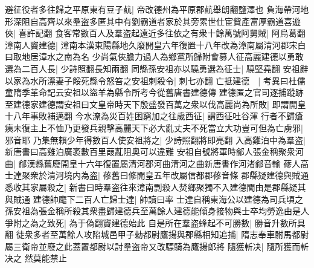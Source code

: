避征役者多往歸之平原東有豆子䴚|{
	帝改德州為平原郡䴚舉朗翻鹽澤也}
負海帶河地形深阻自高齊以來羣盗多匿其中有劉霸道者家於其旁累世仕宦貲產富厚霸道喜遊俠|{
	喜許記翻}
食客常數百人及羣盗起遠近多往依之有衆十餘萬號阿舅賊|{
	阿烏葛翻}
漳南人竇建德|{
	漳南本漢東陽縣地久廢開皇六年復置十八年改為漳南屬清河郡宋白曰取地居漳水之南為名}
少尚氣俠膽力過人為鄉黨所歸附會募人征高麗建德以勇敢選為二百人長|{
	少詩照翻長知兩翻}
同縣孫安祖亦以驍勇選為征士|{
	驍堅堯翻}
安祖辭以家為水所漂妻子餒死縣令怒笞之安祖刺殺令|{
	刺七亦翻}
亡抵建德　|{
	考異曰杜儒童隋季革命記云安祖以盜羊為縣令所考今從舊唐書建德傳}
建德匿之官司逐捕蹤跡至建德家建德謂安祖曰文皇帝時天下殷盛發百萬之衆以伐高麗尚為所敗|{
	即謂開皇十八年事敗補邁翻}
今水潦為災百姓困窮加之往歲西征|{
	謂西征吐谷渾}
行者不歸瘡痍未復主上不恤乃更發兵親擊高麗天下必大亂丈夫不死當立大功豈可但為亡虜邪|{
	邪音耶}
乃集無賴少年得數百人使安祖將之|{
	少詩照翻將即亮翻}
入高雞泊中為羣盗|{
	新唐書曰高雞泊廣袤數百里葭薍阻奥可以違難}
安祖自號將軍時鄃人張金稱聚衆河曲|{
	鄃漢縣舊廢開皇十六年復置屬清河郡河曲清河之曲新唐書作河渚鄃音輸}
蓚人高士達聚衆於清河境内為盗|{
	蓚舊曰修開皇五年改屬信都郡蓚音條}
郡縣疑建德與賊通悉收其家屬殺之|{
	新書曰時羣盗往來漳南剽殺人焚鄉聚獨不入建德閭由是郡縣疑其與賊通}
建德帥麾下二百人亡歸士達|{
	帥讀曰率}
士達自稱東海公以建德為司兵頃之孫安祖為張金稱所殺其衆盡歸建德兵至萬餘人建德能傾身接物與士卒均勞逸由是人爭附之為之致死|{
	為于偽翻竇建德始此}
自是所在羣盗蜂起不可勝數|{
	勝音升數所具翻}
徒衆多者至萬餘人攻陷城邑甲子勑都尉鷹揚與郡縣相知追捕|{
	隋志奉車駙馬都尉屬三衛帝並廢之此蓋置都尉以討羣盗帝又改驃騎為鷹揚郎將}
隨獲斬决|{
	隨所獲而斬决之}
然莫能禁止

